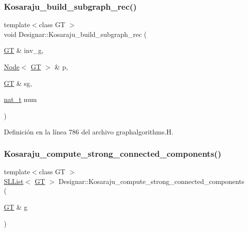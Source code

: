 \subsubsection{\texorpdfstring{Kosaraju\+\_\+build\+\_\+subgraph\+\_\+rec()}{Kosaraju\_build\_subgraph\_rec()}}
{\footnotesize\ttfamily template$<$class GT $>$ \\
void Designar\+::\+Kosaraju\+\_\+build\+\_\+subgraph\+\_\+rec (\begin{DoxyParamCaption}\item[{\hyperlink{demo-buildgraph_8_c_a3001c40d2c31ca87ed96cd7d1334a55e}{GT} \&}]{inv\+\_\+g,  }\item[{\hyperlink{namespace_designar_a5af326c65aa2bd26b26c410f2030d09e}{Node}$<$ \hyperlink{demo-buildgraph_8_c_a3001c40d2c31ca87ed96cd7d1334a55e}{GT} $>$ \&}]{p,  }\item[{\hyperlink{demo-buildgraph_8_c_a3001c40d2c31ca87ed96cd7d1334a55e}{GT} \&}]{sg,  }\item[{\hyperlink{namespace_designar_aa72662848b9f4815e7bf31a7cf3e33d1}{nat\+\_\+t}}]{num }\end{DoxyParamCaption})}



Definición en la línea 786 del archivo graphalgorithms.\+H.

\mbox{\label{namespace_designar_a53b8f28f7265931cb9a0d2ef95fec0d1}} 
\subsubsection{\texorpdfstring{Kosaraju\+\_\+compute\+\_\+strong\+\_\+connected\+\_\+components()}{Kosaraju\_compute\_strong\_connected\_components()}}
{\footnotesize\ttfamily template$<$class GT $>$ \\
\hyperlink{class_designar_1_1_s_l_list}{S\+L\+List}$<$ \hyperlink{demo-buildgraph_8_c_a3001c40d2c31ca87ed96cd7d1334a55e}{GT} $>$ Designar\+::\+Kosaraju\+\_\+compute\+\_\+strong\+\_\+connected\+\_\+components (\begin{DoxyParamCaption}\item[{\hyperlink{demo-buildgraph_8_c_a3001c40d2c31ca87ed96cd7d1334a55e}{GT} \&}]{g }\end{DoxyParamCaption})}



